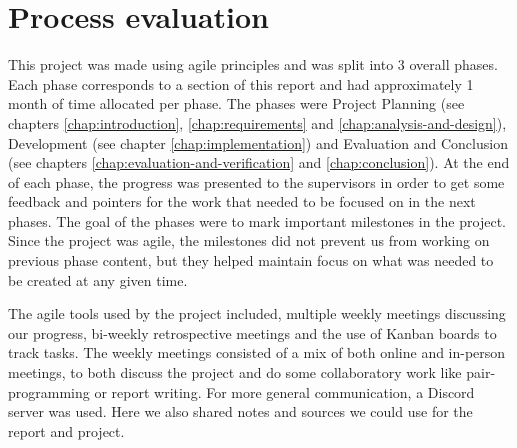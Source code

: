 \section{Process evaluation}
\label{sec:process-evaluation}

This project was made using agile principles and was split into 3 overall phases. Each phase corresponds to a section of
this report and had approximately 1 month of time allocated per phase. The phases were Project Planning 
(see chapters \ref{chap:introduction}, \ref{chap:requirements} and \ref{chap:analysis-and-design}), Development 
(see chapter \ref{chap:implementation}) and Evaluation and Conclusion (see chapters \ref{chap:evaluation-and-verification} 
and \ref{chap:conclusion}). At the end of each phase, the progress was presented to the supervisors in order to get some 
feedback and pointers for the work that needed to be focused on in the next phases. The goal of the phases were to mark 
important milestones in the project. Since the project was agile, the milestones did not prevent us from working on 
previous phase content, but they helped maintain focus on what was needed to be created at any given time.

The agile tools used by the project included, multiple weekly meetings discussing our progress, bi-weekly retrospective 
meetings and the use of Kanban boards to track tasks. The weekly meetings consisted of a mix of both online and in-person
meetings, to both discuss the project and do some collaboratory work like pair-programming or report writing. For more 
general communication, a Discord server was used. Here we also shared notes and sources we could use for the report and 
project.

